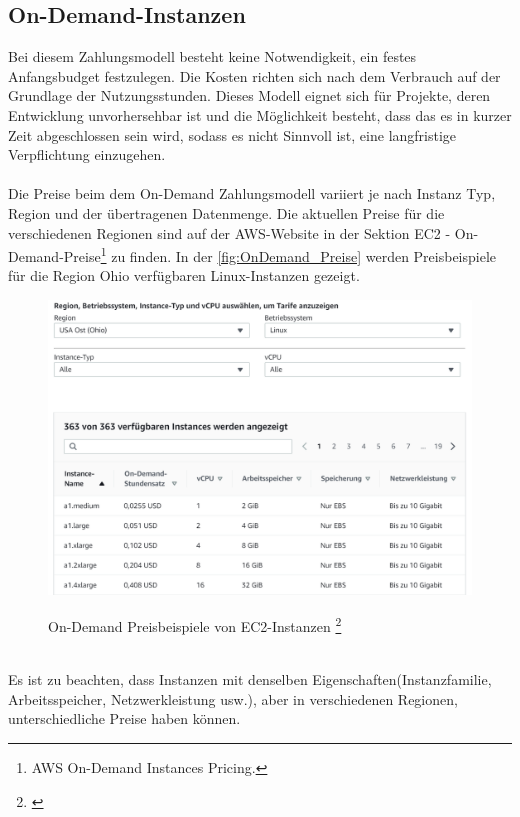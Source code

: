 \subsection{On-Demand-Instanzen}
Bei diesem Zahlungsmodell besteht keine Notwendigkeit, ein festes Anfangsbudget festzulegen. Die Kosten richten sich nach dem Verbrauch auf der Grundlage der Nutzungsstunden. Dieses Modell eignet sich für Projekte, deren Entwicklung unvorhersehbar ist und die Möglichkeit besteht, dass das es in kurzer Zeit abgeschlossen sein wird, sodass es nicht Sinnvoll ist, eine langfristige Verpflichtung einzugehen.
\\\\
Die Preise beim dem On-Demand Zahlungsmodell variiert je nach Instanz Typ, Region und der übertragenen Datenmenge. Die aktuellen Preise für die verschiedenen Regionen sind auf der AWS-Website in der Sektion EC2 - On-Demand-Preise\footnote{AWS On-Demand Instances Pricing.\cite{AMZ02}} zu finden. 
In der \autoref{fig:OnDemand_Preise} werden Preisbeispiele für die Region Ohio verfügbaren Linux-Instanzen gezeigt.
\begin{figure}
    \centering
    \includegraphics[scale=0.5]{sources/On-Demand-Pläne für Amazon EC2}\label{fig:OnDemand_Preise}\\
    \caption[On-Demand Preise für Amazon EC2]{}
    \label{fig:OnDemand_Preise}  On-Demand Preisbeispiele von EC2-Instanzen \footnote{\cite{AMZ02}}
  \end{figure}
\\
Es ist zu beachten, dass Instanzen mit denselben Eigenschaften(Instanzfamilie, Arbeitsspeicher, Netzwerkleistung usw.), aber in verschiedenen Regionen, unterschiedliche Preise haben können.
